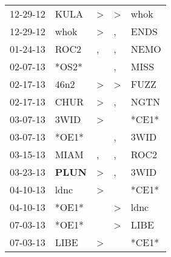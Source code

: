 \begin{supertabular}{p{0.07\textwidth}p{0.06\textwidth}p{0.02\textwidth}p{0.02\textwidth}p{0.06\textwidth}}
          12-29-12\textsuperscript{} &           KULA\textsuperscript{} &     \textgreater &     \textgreater &           whok\textsuperscript{} \\
          12-29-12\textsuperscript{} &           whok\textsuperscript{} &     \textgreater &                , &           ENDS\textsuperscript{} \\
          01-24-13\textsuperscript{} &           ROC2\textsuperscript{} &                , &                , &           NEMO\textsuperscript{} \\
          02-07-13\textsuperscript{} &                            *OS2* &                  &                , &           MISS\textsuperscript{} \\
          02-17-13\textsuperscript{} &           46n2\textsuperscript{} &     \textgreater &     \textgreater &           FUZZ\textsuperscript{} \\
          02-17-13\textsuperscript{} &           CHUR\textsuperscript{} &     \textgreater &                , &           NGTN\textsuperscript{} \\
          03-07-13\textsuperscript{} &           3WID\textsuperscript{} &     \textgreater &                  &                            *CE1* \\
          03-07-13\textsuperscript{} &                            *OE1* &                  &                , &           3WID\textsuperscript{} \\
          03-15-13\textsuperscript{} &           MIAM\textsuperscript{} &                , &                , &           ROC2\textsuperscript{} \\
          03-23-13\textsuperscript{} &  \textbf{PLUN\textsuperscript{}} &     \textgreater &                , &           3WID\textsuperscript{} \\
          04-10-13\textsuperscript{} &           ldnc\textsuperscript{} &     \textgreater &                  &                            *CE1* \\
          04-10-13\textsuperscript{} &                            *OE1* &                  &     \textgreater &           ldnc\textsuperscript{} \\
          07-03-13\textsuperscript{} &                            *OE1* &                  &     \textgreater &           LIBE\textsuperscript{} \\
          07-03-13\textsuperscript{} &           LIBE\textsuperscript{} &     \textgreater &                  &                            *CE1* \\

\end{supertabular}
